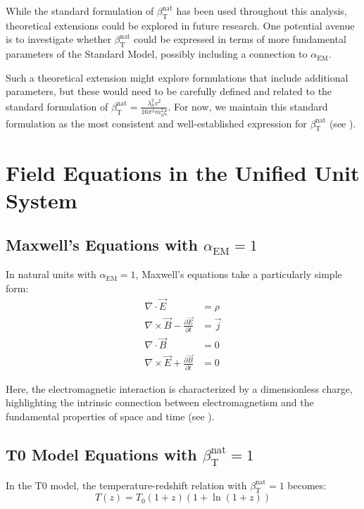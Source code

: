 \documentclass[12pt,a4paper]{article}
\newcommand{\alphaEM}{\alpha_{\text{EM}}}
\newcommand{\betaT}{\beta_{\text{T}}}
\begin{document}
	While the standard formulation of \(\betaT^{\text{nat}}\) has been used throughout this analysis, theoretical extensions could be explored in future research. One potential avenue is to investigate whether \(\betaT^{\text{nat}}\) could be expressed in terms of more fundamental parameters of the Standard Model, possibly including a connection to \(\alphaEM\).
	
	Such a theoretical extension might explore formulations that include additional parameters, but these would need to be carefully defined and related to the standard formulation of \(\betaT^{\text{nat}} = \frac{\lambda_h^2 v^2}{16\pi^3 m_h^2 \xi}\). For now, we maintain this standard formulation as the most consistent and well-established expression for \(\betaT^{\text{nat}}\) (see \cite{pascher_params_2025}).
	
	\section{Field Equations in the Unified Unit System}
	\label{sec:field_equations}
	
	\subsection{Maxwell's Equations with \(\alphaEM = 1\)}
	\label{subsec:maxwell}
	
	In natural units with \(\alphaEM = 1\), Maxwell's equations take a particularly simple form:
	\begin{align}
		\nabla \cdot \vec{E} &= \rho \\
		\nabla \times \vec{B} - \frac{\partial \vec{E}}{\partial t} &= \vec{j} \\
		\nabla \cdot \vec{B} &= 0 \\
		\nabla \times \vec{E} + \frac{\partial \vec{B}}{\partial t} &= 0
	\end{align}
	
	Here, the electromagnetic interaction is characterized by a dimensionless charge, highlighting the intrinsic connection between electromagnetism and the fundamental properties of space and time (see \cite{pascher_alpha_2025}).
	
	\subsection{T0 Model Equations with \(\betaT^{\text{nat}} = 1\)}
	\label{subsec:t0_equations}
	
	In the T0 model, the temperature-redshift relation with \(\betaT^{\text{nat}} = 1\) becomes:
	\begin{equation}
		T(z) = T_0 (1+z)(1+\ln(1+z))
	\end{equation}
	
\end{document}
